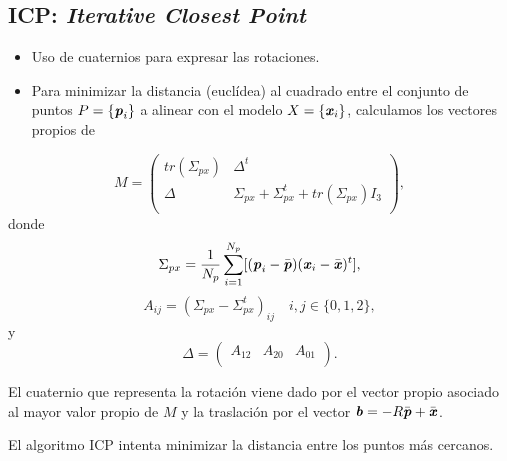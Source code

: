 \documentclass[9pt]{beamer}
\newcommand{\xx}{\textbf{\emph{x}}}
\newcommand{\pp}{\textbf{\emph{p}}}
\newcommand{\bb}{\textbf{\emph{b}}}
\begin{document}
	\subsection{ICP: \textit{Iterative Closest Point}}
	\begin{frame}
		\begin{itemize}
			\item Uso de cuaternios para expresar las rotaciones. 
			\item Para minimizar la distancia (euclídea) al cuadrado entre el conjunto de puntos $ P = \{\pp_i\}$ a alinear con el modelo $ X = \{\xx_i\} $, calculamos los vectores propios de 
		\end{itemize}
	
		\begin{equation}\label{matCov}
		M  =
		\begin{pmatrix}
		tr(\Sigma_{px}) & \Delta^t \\
		\Delta & \Sigma_{px} + \Sigma_{px}^t + tr(\Sigma_{px})I_3\\
		\end{pmatrix}, 
		\end{equation}
		donde 
		\[
		\Sigma_{px} = \frac{1}{N_p}\sum_{i=1}^{N_p} \lbrack (\pp_i-\bar{\pp})(\xx_i - \bar{\xx})^t\rbrack, \]
		\[A_{ij} = (\Sigma_{px}-\Sigma_{px}^t)_{ij} \quad i,j \in \lbrace 0,1,2 \rbrace,\]
		y 
		\[\Delta = \begin{pmatrix}
		A_{12} & A_{20} & A_{01}  \\
		\end{pmatrix}. \]
		
		El cuaternio que representa la rotación viene dado por el vector propio asociado al mayor valor propio de $ M $ y la traslación por el vector $ \bb = -R\bar{\pp}  + \bar{\xx} $. 
		
		El algoritmo ICP intenta minimizar la distancia entre los puntos más cercanos.
	
	\end{frame}
\end{document}
